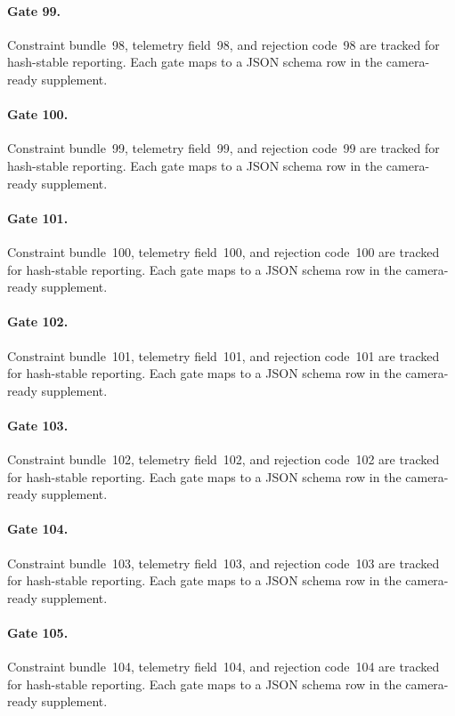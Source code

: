 \documentclass[sigconf,nonacm]{acmart}
\begin{document}
\paragraph{Gate 99.}
Constraint bundle~98, telemetry field~98, and rejection code~98 are tracked for hash-stable reporting. Each gate maps to a JSON schema row in the camera-ready supplement. %

\paragraph{Gate 100.}
Constraint bundle~99, telemetry field~99, and rejection code~99 are tracked for hash-stable reporting. Each gate maps to a JSON schema row in the camera-ready supplement. %

\paragraph{Gate 101.}
Constraint bundle~100, telemetry field~100, and rejection code~100 are tracked for hash-stable reporting. Each gate maps to a JSON schema row in the camera-ready supplement. %

\paragraph{Gate 102.}
Constraint bundle~101, telemetry field~101, and rejection code~101 are tracked for hash-stable reporting. Each gate maps to a JSON schema row in the camera-ready supplement. %

\paragraph{Gate 103.}
Constraint bundle~102, telemetry field~102, and rejection code~102 are tracked for hash-stable reporting. Each gate maps to a JSON schema row in the camera-ready supplement. %

\paragraph{Gate 104.}
Constraint bundle~103, telemetry field~103, and rejection code~103 are tracked for hash-stable reporting. Each gate maps to a JSON schema row in the camera-ready supplement. %

\paragraph{Gate 105.}
Constraint bundle~104, telemetry field~104, and rejection code~104 are tracked for hash-stable reporting. Each gate maps to a JSON schema row in the camera-ready supplement. %
\end{document}
